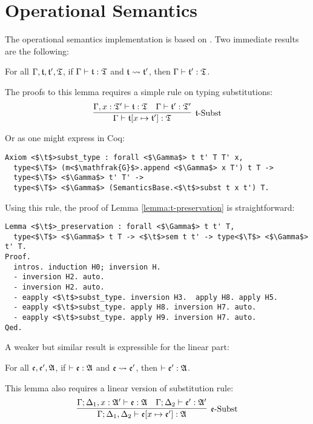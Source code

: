 \section{Operational Semantics}

The operational semantics implementation is based on . Two immediate results are the following:

\begin{lemma}[$\t$-Preservation]
\label{lemma:t-preservation}
For all $\Gamma, \mathfrak{t}, \mathfrak{t}', \mathfrak{T}$, if $\Gamma \vdash \mathfrak{t} : \mathfrak{T}$ and $\mathfrak{t} \leadsto \mathfrak{t}'$, then $\Gamma \vdash \mathfrak{t}' : \mathfrak{T}$.
\end{lemma}

The proofs to this lemma requires a simple rule on typing substitutions:
\[
\infer[\mbox{$\t$-Subst}]{\Gamma \vdash \t[x \mapsto \t'] : \T}{
    \Gamma, x : \T' \vdash \t : \T
    &
    \Gamma \vdash \t' : \T'
}
\]

Or as one might express in Coq:
\begin{verbatim}
Axiom <$\t$>subst_type : forall <$\Gamma$> t t' T T' x,
  type<$\T$> (m<$\mathfrak{G}$>.append <$\Gamma$> x T') t T -> 
  type<$\T$> <$\Gamma$> t' T' -> 
  type<$\T$> <$\Gamma$> (SemanticsBase.<$\t$>subst t x t') T.
\end{verbatim}

Using this rule, the proof of Lemma \ref{lemma:t-preservation} is straightforward:

\begin{verbatim}
Lemma <$\t$>_preservation : forall <$\Gamma$> t t' T, 
  type<$\T$> <$\Gamma$> t T -> <$\t$>sem t t' -> type<$\T$> <$\Gamma$> t' T.
Proof.
  intros. induction H0; inversion H.
  - inversion H2. auto.
  - inversion H2. auto.
  - eapply <$\t$>subst_type. inversion H3.  apply H8. apply H5.
  - eapply <$\t$>subst_type. apply H8. inversion H7. auto.
  - eapply <$\t$>subst_type. apply H9. inversion H7. auto.
Qed.
\end{verbatim}

A weaker but similar result is expressible for the linear part:

\begin{lemma}
\label{lemma:e-preservation-weak}
For all $\mathfrak{e}, \mathfrak{e}', \mathfrak{A}$, if $\vdash \mathfrak{e} : \mathfrak{A}$ and $\mathfrak{e} \leadsto \mathfrak{e}'$, then $\vdash \mathfrak{e}' : \mathfrak{A}$.
\end{lemma}

This lemma also requires a linear version of substitution rule:
\[
\infer[\mbox{$\e$-Subst}]{\Gamma; \Delta_1, \Delta_2 \vdash \e[x \mapsto \e'] : \A}{
    \Gamma; \Delta_1, x : \A' \vdash \e : \A
    &
    \Gamma; \Delta_2 \vdash \e' : \A'
}
\]

